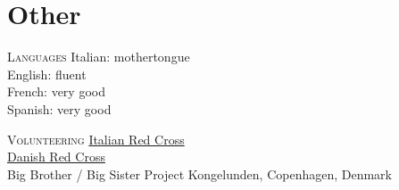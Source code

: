 \section*{Other}

\begin{paracol}{2}
  \textsc{Languages}
\switchcolumn
  Italian: mothertongue\\
  English: fluent\\
  French: very good\\
  Spanish: very good
\end{paracol}

\begin{paracol}{2}
  \textsc{Volunteering}
\switchcolumn
  \href{https://www.cri.it}{Italian Red Cross}\\
  \href{https://www.rodekors.dk/}{Danish Red Cross}\\
  Big Brother / Big Sister Project Kongelunden, Copenhagen, Denmark
\end{paracol}